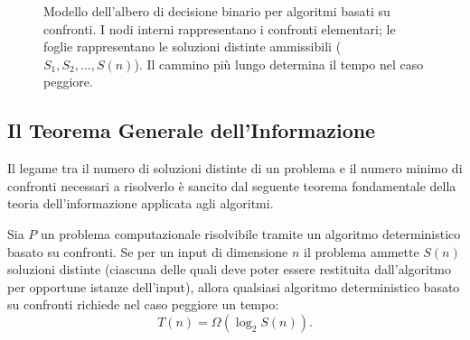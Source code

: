 \begin{figure}[H]
  \caption{Modello dell'albero di decisione binario per algoritmi basati su confronti. I nodi interni rappresentano i confronti elementari; le foglie rappresentano le soluzioni distinte ammissibili ($S_1, S_2, \dots, S(n)$). Il cammino più lungo determina il tempo nel caso peggiore.}
  \label{fig:decision-tree-model}
\end{figure}

\FloatBarrier
\subsection{Il Teorema Generale dell'Informazione}
\label{subsec:general-information-theorem}

Il legame tra il numero di soluzioni distinte di un problema e il numero minimo di confronti necessari a risolverlo è sancito dal seguente teorema fondamentale della teoria dell'informazione applicata agli algoritmi.

\begin{theorem}
\label{thm:information-theoretic-bound}
Sia $P$ un problema computazionale risolvibile tramite un algoritmo deterministico basato su confronti. Se per un input di dimensione $n$ il problema ammette $S(n)$ soluzioni distinte (ciascuna delle quali deve poter essere restituita dall'algoritmo per opportune istanze dell'input), allora qualsiasi algoritmo deterministico basato su confronti richiede nel caso peggiore un tempo:
\begin{equation}
  T(n) = \Omega(\log_2 S(n)).
\end{equation}
\end{theorem}

